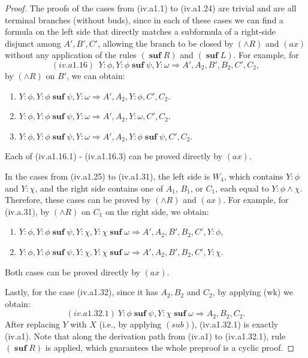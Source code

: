 \documentclass[manuscript,screen]{acmart}
\newcommand{\Sub}[0]{{\textit{sub}}}
\DeclareMathOperator{\osuf}{\mathbf{suf}}
\begin{document}
\begin{proof}
The proofs of the cases from (iv.a1.1) to (iv.a1.24) are trivial and are all terminal branches (without buds), since in each of these cases we can find a formula on the left side that directly matches a subformula of a right-side disjunct among $A', B', C'$, allowing the branch to be closed by $(\wedge R)$ and $(ax)$ without any application of the rules $(\osuf R)$ and $(\osuf L)$.
For example, for 
$$
(iv.a1.16)\ \ Y : \phi, Y : \phi\osuf \psi, Y : \omega\Rightarrow A', A_2, B', B_2, C', C_2, 
$$
by $(\wedge R)$ on $B'$, we can obtain:
\begin{enumerate}
\item[(iv.a1.16.1)] $Y : \phi, Y : \phi\osuf \psi, Y : \omega\Rightarrow A', A_2, Y : \phi, C', C_2$.
\item[(iv.a1.16.2)] $Y : \phi, Y : \phi\osuf \psi, Y : \omega\Rightarrow A', A_2, Y : \omega, C', C_2$.
\item[(iv.a1.16.3)] $Y : \phi, Y : \phi\osuf \psi, Y : \omega\Rightarrow A', A_2, Y : \phi\osuf \psi, C', C_2$.
\end{enumerate}
Each of (iv.a1.16.1) - (iv.a1.16.3) can be proved directly by $(ax)$. 

In the cases from (iv.a1.25) to (iv.a1.31), the left side is $W_4$, which contains $Y : \phi$ and $Y : \chi$, and the right side contains one of $A_1$, $B_1$, or $C_1$, each equal to $Y : \phi\wedge\chi$. Therefore, these cases can be proved by $(\wedge R)$ and $(ax)$. 
For example, for (iv.a.31), by $(\wedge R)$ on $C_1$ on the right side, we obtain:
\begin{enumerate}
\item[(iv.a.31.1)] $Y : \phi, Y : \phi\osuf \psi, Y : \chi, Y : \chi\osuf \omega\Rightarrow A', A_2, B', B_2, C', Y : \phi$,
\item[(iv.a.31.2)] $Y : \phi, Y : \phi\osuf \psi, Y : \chi, Y : \chi\osuf \omega\Rightarrow A', A_2, B', B_2, C', Y : \chi$. 
\end{enumerate}
Both cases can be proved directly by $(ax)$. 

Lastly, for the case (iv.a1.32), since it has $A_2, B_2$ and $C_2$, by applying (wk) we obtain:
$$
(iv.a1.32.1)\ Y : \phi\osuf\psi, Y : \chi\osuf \omega\Rightarrow A_2, B_2, C_2. 
$$
After replacing $Y$ with $X$ (i.e., by applying $(\Sub)$), (iv.a1.32.1) is exactly (iv.a1). 
Note that along the derivation path from (iv.a1) to (iv.a1.32.1), rule $(\osuf R)$ is applied, which guarantees the whole preproof is a cyclic proof. 


\end{proof}
\end{document}
